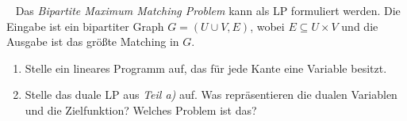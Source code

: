 \documentclass{uebung_cs}
\begin{document}
\begin{exercise}\
	Das \emph{Bipartite Maximum Matching Problem} kann als \acs{LP} formuliert werden. Die Eingabe ist ein bipartiter Graph $G = (U \cup V, E)$, wobei $E \subseteq U \times V$ und die Ausgabe ist das größte Matching in $G$.
	\begin{enumerate}
		\item Stelle ein lineares Programm auf, das für jede Kante eine Variable besitzt.
		\item Stelle das duale \acs{LP} aus \emph{Teil a)} auf. Was repräsentieren die dualen Variablen und die Zielfunktion? Welches Problem ist das?
	\end{enumerate}
\end{exercise}
\end{document}

